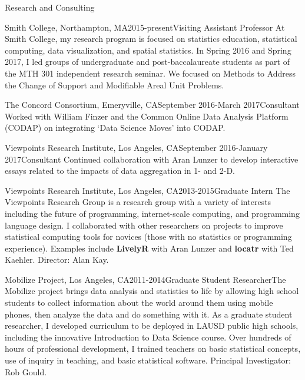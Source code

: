 \documentclass{resume} %
\begin{document}
\begin{rSection}{Research and Consulting}
\begin{pSubsection}{Smith College, }{Northampton, MA}{2015-present}{Visiting Assistant Professor}
{At Smith College, my research program is focused on statistics education, statistical computing, data visualization, and spatial statistics. In Spring 2016 and Spring 2017, I led groups of undergraduate and post-baccalaureate students as part of the MTH 301 independent research seminar. We focused on Methods to Address the Change of Support and Modifiable Areal Unit Problems.}
\end{pSubsection}


\begin{pSubsection}{The Concord Consortium, }{Emeryville, CA}{September 2016-March 2017}{Consultant}
{Worked with William Finzer and the Common Online Data Analysis Platform (CODAP) on integrating `Data Science Moves' into CODAP.}
\end{pSubsection}


\begin{pSubsection}{Viewpoints Research Institute, }{Los Angeles, CA}{September 2016-January 2017}{Consultant}
{Continued collaboration with Aran Lunzer to develop interactive essays related to the impacts of data aggregation in 1- and 2-D.}
\end{pSubsection}

\begin{pSubsection}{Viewpoints Research Institute, }{Los Angeles, CA}{2013-2015}{Graduate Intern}
{The Viewpoints Research Group is a research group with a variety of interests including the future of programming, internet-scale computing, and programming language design. I collaborated with other researchers on projects to improve statistical computing tools for novices (those with no statistics or programming experience). Examples include \textbf{LivelyR} with Aran Lunzer and \textbf{locatr} with Ted Kaehler. Director: Alan Kay.}
\end{pSubsection}

\begin{pSubsection}{Mobilize Project, }{Los Angeles, CA}{2011-2014}{Graduate Student Researcher}{The Mobilize project brings data analysis and statistics to life by allowing high school students to collect information about the world around them using mobile phones, then analyze the data and do something with it. As a graduate student researcher, I developed curriculum to be deployed in LAUSD public high schools, including the innovative Introduction to Data Science course. Over hundreds of hours of professional development, I trained teachers on basic statistical concepts, use of inquiry in teaching, and basic statistical software. Principal Investigator: Rob Gould.}
\end{pSubsection}
\end{rSection}
\end{document}
